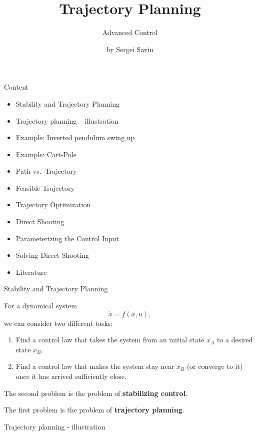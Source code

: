 \documentclass{beamer}
\title{Trajectory Planning}
\subtitle{Advanced Control}
\author{by Sergei Savin}
\date{\mydate}
\begin{document}
\maketitle


\begin{frame}{Content}
	\begin{itemize}
		\item Stability and Trajectory Planning
		\item Trajectory planning -- illustration
		\item Example: Inverted pendulum swing up
		\item Example: Cart-Pole
		\item Path vs.\ Trajectory
		\item Feasible Trajectory
		\item Trajectory Optimization
		\item Direct Shooting
		\item Parameterizing the Control Input
		\item Solving Direct Shooting
		\item Literature
	\end{itemize}
\end{frame}


\begin{frame}{Stability and Trajectory Planning}
	\begin{flushleft}
	
	For a dynamical system
	\[
	\dot{x}=f(x,u),
	\]
	we can consider two different tasks:
	
	\begin{enumerate}
		\item Find a control law that takes the system
		from an initial state $x_A$ to a desired state $x_B$.
		
		\item Find a control law that makes the system
		stay near $x_B$ (or converge to it) once it has
		arrived sufficiently close.
	\end{enumerate}
	
	\vspace{0.5em}
	
	The second problem is the problem of
	\textbf{stabilizing control}.
	
	The first problem is the problem of
	\textbf{trajectory planning}.
	
	\end{flushleft}
\end{frame}


\begin{frame}{Trajectory planning - illustration}
	\begin{flushleft}
		
		
		
	\end{flushleft}
\end{frame}
\end{document}
